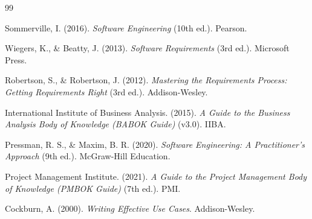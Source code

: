 \documentclass[11pt,a4paper]{article}
\begin{document}
\begin{thebibliography}{99}

	Sommerville, I. (2016).
	\textit{Software Engineering} (10th ed.).
	Pearson.

	Wiegers, K., \& Beatty, J. (2013).
	\textit{Software Requirements} (3rd ed.).
	Microsoft Press.

	Robertson, S., \& Robertson, J. (2012).
	\textit{Mastering the Requirements Process: Getting Requirements Right} (3rd ed.).
	Addison-Wesley.

	International Institute of Business Analysis. (2015).
	\textit{A Guide to the Business Analysis Body of Knowledge (BABOK Guide)} (v3.0).
	IIBA.

	Pressman, R. S., \& Maxim, B. R. (2020).
	\textit{Software Engineering: A Practitioner's Approach} (9th ed.).
	McGraw-Hill Education.

	Project Management Institute. (2021).
	\textit{A Guide to the Project Management Body of Knowledge (PMBOK Guide)} (7th ed.).
	PMI.

	Cockburn, A. (2000).
	\textit{Writing Effective Use Cases}.
	Addison-Wesley.

\end{thebibliography}
\end{document}
